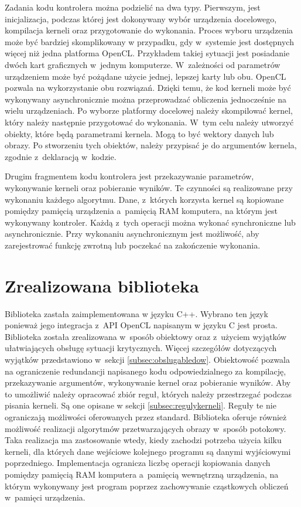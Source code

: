 Zadania kodu kontrolera można podzielić na dwa typy. Pierwszym, jest inicjalizacja, podczas której jest dokonywany wybór urządzenia docelowego, kompilacja kerneli oraz przygotowanie do wykonania. Proces wyboru urządzenia może być bardziej skomplikowany w przypadku, gdy w~systemie jest dostępnych więcej niż jedna platforma OpenCL. Przykładem takiej sytuacji jest posiadanie dwóch kart graficznych w~jednym komputerze. W~zależności od parametrów urządzeniem może być pożądane użycie jednej, lepszej karty lub obu. OpenCL pozwala na wykorzystanie obu rozwiązań. Dzięki temu, że kod kerneli może być wykonywany asynchronicznie można przeprowadzać obliczenia jednocześnie na wielu urządzeniach. Po wyborze platformy docelowej należy skompilować kernel, który należy następnie przygotować do wykonania. W~tym celu należy utworzyć obiekty, które będą parametrami kernela. Mogą to być wektory danych lub obrazy. Po stworzeniu tych obiektów, należy przypisać je do argumentów kernela, zgodnie z~deklaracją w~kodzie.

Drugim fragmentem kodu kontrolera jest przekazywanie parametrów, wykonywanie kerneli oraz pobieranie wyników. Te czynności są realizowane przy wykonaniu każdego algorytmu. Dane, z~których korzysta kernel są kopiowane pomiędzy pamięcią urządzenia a~pamięcią RAM komputera, na którym jest wykonywany kontroler. Każdą z~tych operacji można wykonać synchroniczne lub asynchronicznie. Przy wykonaniu asynchronicznym jest możliwość, aby zarejestrować funkcję zwrotną lub poczekać na zakończenie wykonania.

\section{Zrealizowana biblioteka}  
\label{sec:biblioteka}

Biblioteka zastała zaimplementowana w języku C++. Wybrano ten język ponieważ jego integracja z~API OpenCL napisanym w języku C jest prosta. Biblioteka została zrealizowana w~sposób obiektowy oraz z~użyciem wyjątków ułatwiających obsługę sytuacji krytycznych. Więcej szczegółów dotyczących wyjątków przedstawiono w~sekcji \ref{subsec:obslugabledow}. Obiektowość pozwala na ograniczenie redundancji napisanego kodu odpowiedzialnego za kompilację, przekazywanie argumentów, wykonywanie kernel oraz pobieranie wyników. Aby to umożliwić należy opracować zbiór reguł, których należy przestrzegać podczas pisania kerneli. Są one opisane w sekcji \ref{subsec:regulykerneli}. Reguły te nie ograniczają możliwości oferowanych przez standard. Biblioteka oferuje również możliwość realizacji algorytmów przetwarzających obrazy w~sposób potokowy. Taka realizacja ma zastosowanie wtedy, kiedy zachodzi potrzeba użycia kilku kerneli, dla których dane wejściowe kolejnego programu są danymi wyjściowymi poprzedniego. Implementacja  ogranicza liczbę operacji kopiowania danych pomiędzy pamięcią RAM komputera a~pamięcią wewnętrzną urządzenia, na którym wykonywany jest program poprzez zachowywanie cząstkowych obliczeń w~pamięci urządzenia.

